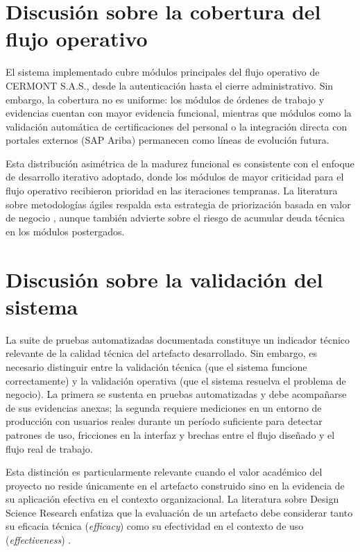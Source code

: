 \section{Discusión sobre la cobertura del flujo operativo}
\label{sec:discusion-cobertura}

El sistema implementado cubre módulos principales del flujo operativo de CERMONT S.A.S., desde la autenticación hasta el cierre administrativo. Sin embargo, la cobertura no es uniforme: los módulos de órdenes de trabajo y evidencias cuentan con mayor evidencia funcional, mientras que módulos como la validación automática de certificaciones del personal o la integración directa con portales externos (SAP Ariba) permanecen como líneas de evolución futura.

Esta distribución asimétrica de la madurez funcional es consistente con el enfoque de desarrollo iterativo adoptado, donde los módulos de mayor criticidad para el flujo operativo recibieron prioridad en las iteraciones tempranas. La literatura sobre metodologías ágiles respalda esta estrategia de priorización basada en valor de negocio \cite{beck2001}, aunque también advierte sobre el riesgo de acumular deuda técnica en los módulos postergados.

\section{Discusión sobre la validación del sistema}
\label{sec:discusion-validacion}

La suite de pruebas automatizadas documentada constituye un indicador técnico relevante de la calidad técnica del artefacto desarrollado. Sin embargo, es necesario distinguir entre la validación técnica (que el sistema funcione correctamente) y la validación operativa (que el sistema resuelva el problema de negocio). La primera se sustenta en pruebas automatizadas y debe acompañarse de sus evidencias anexas; la segunda requiere mediciones en un entorno de producción con usuarios reales durante un período suficiente para detectar patrones de uso, fricciones en la interfaz y brechas entre el flujo diseñado y el flujo real de trabajo.

Esta distinción es particularmente relevante cuando el valor académico del proyecto no reside únicamente en el artefacto construido sino en la evidencia de su aplicación efectiva en el contexto organizacional. La literatura sobre Design Science Research enfatiza que la evaluación de un artefacto debe considerar tanto su eficacia técnica (\textit{efficacy}) como su efectividad en el contexto de uso (\textit{effectiveness}) \cite{hevner2004,peffers2007}.

